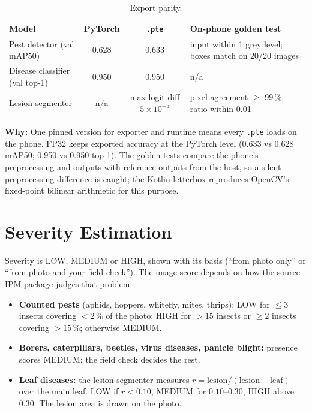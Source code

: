 \documentclass[11pt,a4paper]{article}
\newcommand{\why}[1]{\par\smallskip\noindent\colorbox{leaflight}{\parbox{\dimexpr\linewidth-2\fboxsep}{\small\textbf{\color{leaf}Why:} #1}}\par\smallskip}
\begin{document}
\begin{table}[h]
\centering\small
\begin{tabularx}{\linewidth}{@{}p{4.2cm}ccL@{}}
\toprule
\textbf{Model} & \textbf{PyTorch} & \textbf{\texttt{.pte}} & \textbf{On-phone golden test} \\
\midrule
Pest detector (val mAP50) & 0.628 & 0.633 & input within 1 grey level; boxes match on 20/20 images \\
Disease classifier (val top-1) & 0.950 & 0.950 & n/a \\
Lesion segmenter & n/a & max logit diff $5\times10^{-5}$ & pixel agreement $\geq$ 99\,\%, ratio within 0.01 \\
\bottomrule
\end{tabularx}
\caption{Export parity.}
\end{table}

\why{One pinned version for exporter and runtime means every \texttt{.pte} loads on the phone. FP32 keeps exported
accuracy at the PyTorch level (0.633 vs 0.628 mAP50; 0.950 vs 0.950 top-1). The golden tests compare the phone's
preprocessing and outputs with reference outputs from the host, so a silent preprocessing difference is caught; the Kotlin letterbox reproduces OpenCV's
fixed-point bilinear arithmetic for this purpose.}

\section{Severity Estimation}

Severity is LOW, MEDIUM or HIGH, shown with its basis (``from photo only'' or ``from photo and your field check''). The
image score depends on how the source IPM package judges that problem:

\begin{itemize}
\item \textbf{Counted pests} (aphids, hoppers, whitefly, mites, thrips): LOW for $\leq 3$ insects covering $<2\,\%$ of
the photo; HIGH for $>15$ insects or $\geq 2$ insects covering $>15\,\%$; otherwise MEDIUM.
\item \textbf{Borers, caterpillars, beetles, virus diseases, panicle blight:} presence scores MEDIUM; the field check
decides the rest.
\item \textbf{Leaf diseases:} the lesion segmenter measures $r = \text{lesion} / (\text{lesion} + \text{leaf})$ over
the main leaf. LOW if $r<0.10$, MEDIUM for $0.10$--$0.30$, HIGH above $0.30$. The lesion area is drawn on the photo.
\end{itemize}
\end{document}
